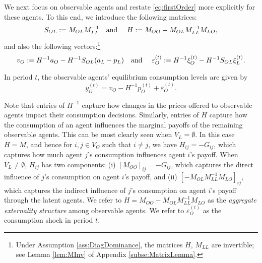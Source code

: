 \documentclass[opre,nonblindrev]{informs3} %
\begin{document}
We next focus
 on observable agents
and restate
\eqref{eq:firstOrder} more explicitly for these agents.
To this end, we introduce the following matrices:
\begin{equation}
\begin{aligned}
S_{OL}:=  M_{OL}M_{LL}^{-1} \mbox{\quad and \quad}
H:= M_{OO}-M_{OL}M_{LL}^{-1}M_{LO},
\end{aligned}
\end{equation}
and also the following vectors:\footnote{Under Assumption \ref{ass:DiagDominance}, the matrices $H$, $M_{LL}$ are invertible; see Lemma \ref{lem:MInv} of Appendix \ref{subse:MatrixLemma}.}
\begin{equation}\label{eq:defVo}
{v}_O := H^{-1}  {a}_O-H^{-1} S_{OL} ( {a}_L - {p}_L) \mbox{\quad and \quad}
\varepsilon_O^{(t)} := H^{-1} \xi_O^{(t)}-H^{-1} S_{OL}  {\xi}^{(t)}_L.
\end{equation}





  \begin{lemma} \label{lem:firstOrderO}
 In period $t$, the observable
    agents' equilibrium consumption levels are given by
  	\begin{equation}\label{eq:def:noise1}
{y}_O^{(t)}
  	 =  {v}_O-H^{-1} {p}_O^{(t)} +\varepsilon_O^{(t)}.
  	\end{equation}
  	\end{lemma}


Note that entries of $H^{-1}$ capture how changes in the prices offered to observable  agents impact their consumption decisions.
Similarly, entries of $H$ capture how the consumption of an agent influences the marginal payoffs of the remaining observable agents. This can be most clearly seen when $V_L=\emptyset$. In this case $H=M$,  and hence
for $i,j\in V_O$ such that $i\neq j$, we have
$H_{ij}=-G_{ij}$, which captures  how much agent $j$'s consumption  influences agent $i$'s payoff. When $V_L\neq \emptyset$, $H_{ij}$
has two components: (i) $[ M_{OO}]_{ij}=-G_{ij}$, which captures the direct influence of $j$'s consumption on agent $i$'s payoff, and (ii)
$[-M_{OL}M_{LL}^{-1}M_{LO}]_{ij} $, which captures the indirect influence of $j$'s consumption on agent $i$'s payoff through the latent agents.
We refer to $H=M_{OO}-M_{OL}M_{LL}^{-1}M_{LO}$ as the \emph{aggregate externality structure}  among observable agents.
We refer to $\varepsilon_O^{(t)}$ as the consumption shock in period $t$.
\end{document}
